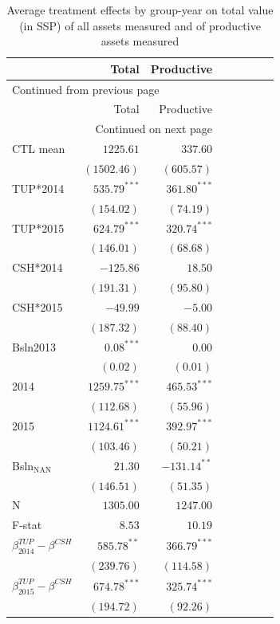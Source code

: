 \documentclass[12pt,article]{article}
\begin{document}
\begin{longtable}{lrrrrrrr}
\caption{\label{tab:orgtable4}
Average treatment effects by group-year on total value (in SSP) of all assets measured and of productive assets measured}
\\
\hline
 & Total & Productive\\
\hline
\endfirsthead
\multicolumn{3}{l}{Continued from previous page} \\
\hline

 & Total & Productive \\

\hline
\endhead
\hline\multicolumn{3}{r}{Continued on next page} \\
\endfoot
\endlastfoot
\hline
CTL mean & \(1225.61\) & \(337.60\)\\
 & \((1502.46)\) & \((605.57)\)\\
\hline
TUP*2014 & \(535.79^{***}\) & \(361.80^{***}\)\\
 & \((154.02)\) & \((74.19)\)\\
TUP*2015 & \(624.79^{***}\) & \(320.74^{***}\)\\
 & \((146.01)\) & \((68.68)\)\\
CSH*2014 & \(-125.86\) & \(18.50\)\\
 & \((191.31)\) & \((95.80)\)\\
CSH*2015 & \(-49.99\) & \(-5.00\)\\
 & \((187.32)\) & \((88.40)\)\\
Bsln2013 & \(0.08^{***}\) & \(0.00\)\\
 & \(( 0.02)\) & \(( 0.01)\)\\
2014 & \(1259.75^{***}\) & \(465.53^{***}\)\\
 & \((112.68)\) & \((55.96)\)\\
2015 & \(1124.61^{***}\) & \(392.97^{***}\)\\
 & \((103.46)\) & \((50.21)\)\\
Bsln\(_{\text{NAN}}\) & \(21.30\) & \(-131.14^{**}\)\\
 & \((146.51)\) & \((51.35)\)\\
\hline
N & \(1305.00\) & \(1247.00\)\\
F-stat & \(8.53\) & \(10.19\)\\
\hline
\(\beta^{TUP}_{2014}-\beta^{CSH}\) & \(585.78^{**}\) & \(366.79^{***}\)\\
 & \((239.76)\) & \((114.58)\)\\
\(\beta^{TUP}_{2015}-\beta^{CSH}\) & \(674.78^{***}\) & \(325.74^{***}\)\\
 & \((194.72)\) & \((92.26)\)\\
\hline
\end{longtable}
\end{document}
